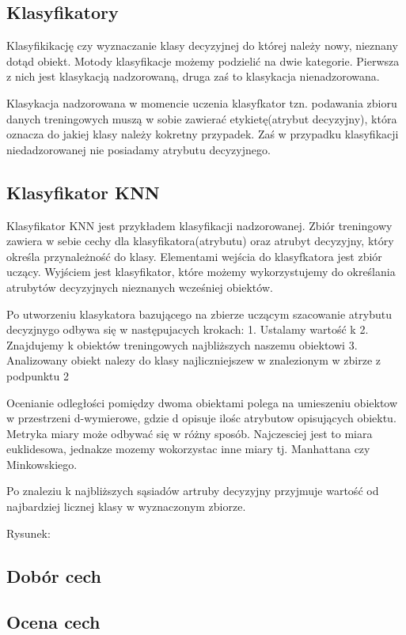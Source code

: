 \documentclass[a4paper,12pt,twoside,openany]{report}
\begin{document}
\subsection{Klasyfikatory}
Klasyfikikację czy wyznaczanie klasy decyzyjnej do której należy nowy, nieznany dotąd obiekt. Motody klasyfikacje możemy podzielić na dwie kategorie. Pierwsza z nich jest klasykacją nadzorowaną, druga zaś to klasykacja nienadzorowana. 

Klasykacja nadzorowana w momencie uczenia klasyfkator tzn. podawania zbioru danych treningowych muszą w sobie zawierać etykietę(atrybut decyzyjny), która oznacza do jakiej klasy należy kokretny przypadek. Zaś w przypadku klasyfikacji niedadzorowanej nie posiadamy atrybutu decyzyjnego.

\subsection{Klasyfikator KNN}
Klasyfikator KNN jest przykładem klasyfikacji nadzorowanej. Zbiór treningowy zawiera w sebie cechy dla klasyfikatora(atrybutu) oraz atrubyt decyzyjny, który określa przynależność do klasy. Elementami wejścia do klasyfkatora jest zbiór uczący. Wyjściem jest klasyfikator, które możemy wykorzystujemy do określania atrubytów decyzyjnych nieznanych wcześniej obiektów.

Po utworzeniu klasykatora bazującego na zbierze uczącym szacowanie atrybutu decyzjnygo odbywa się w następujacych krokach:
1. Ustalamy wartość k
2. Znajdujemy k obiektów treningowych najbliższych naszemu obiektowi
3. Analizowany obiekt nalezy do klasy najliczniejszew w znalezionym w zbirze z podpunktu 2

Ocenianie odległości pomiędzy dwoma obiektami polega na umieszeniu obiektow w przestrzeni d-wymierowe, gdzie d opisuje ilośc atrybutow opisujących obiektu. Metryka miary może odbywać się w różny sposób. Najczesciej jest to miara euklidesowa, jednakze mozemy wokorzystac inne miary tj. Manhattana czy Minkowskiego. 

Po znaleziu k najbliższych sąsiadów artruby decyzyjny przyjmuje wartość od najbardziej licznej klasy w wyznaczonym zbiorze.

Rysunek:


\subsection{Dobór cech}
\subsection{Ocena cech}
\end{document}

